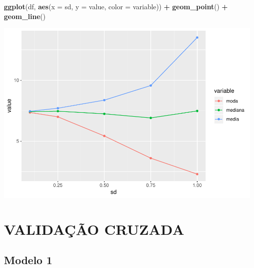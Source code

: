 \documentclass[]{article}
\newenvironment{Shaded}{\begin{snugshade}}{\end{snugshade}}
\newcommand{\KeywordTok}[1]{\textcolor[rgb]{0.13,0.29,0.53}{\textbf{#1}}}
\newcommand{\DataTypeTok}[1]{\textcolor[rgb]{0.13,0.29,0.53}{#1}}
\newcommand{\StringTok}[1]{\textcolor[rgb]{0.31,0.60,0.02}{#1}}
\newcommand{\OperatorTok}[1]{\textcolor[rgb]{0.81,0.36,0.00}{\textbf{#1}}}
\newcommand{\NormalTok}[1]{#1}
\begin{document}
\begin{Shaded}
\begin{Highlighting}[]
\KeywordTok{ggplot}\NormalTok{(df, }\KeywordTok{aes}\NormalTok{(}\DataTypeTok{x =}\NormalTok{ sd, }\DataTypeTok{y =}\NormalTok{ value, }\DataTypeTok{color =}\NormalTok{ variable)) }\OperatorTok{+}\StringTok{ }
\StringTok{  }\KeywordTok{geom_point}\NormalTok{() }\OperatorTok{+}\StringTok{ }\KeywordTok{geom_line}\NormalTok{()}
\end{Highlighting}
\end{Shaded}

\includegraphics{Impacto_sigma_files/figure-latex/unnamed-chunk-38-1.pdf}

\section{VALIDAÇÃO CRUZADA}\label{validacao-cruzada}

\subsection{Modelo 1}\label{modelo-1-1}
\end{document}
